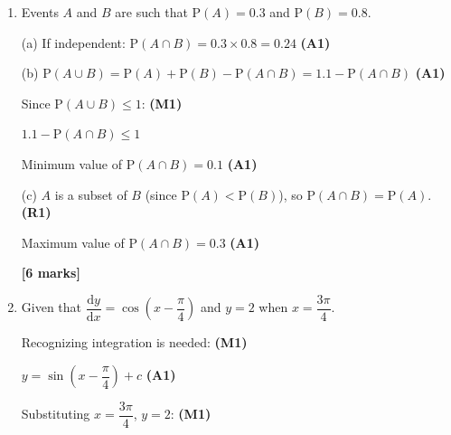 \documentclass[12pt, twoside]{article}
\begin{document}
\begin{enumerate}[itemsep=0.4cm]
Let $\theta = \dfrac{x}{2} + \dfrac{\pi}{3}$.

Reference angle for $\cos\theta = \dfrac{1}{\sqrt{2}}$: $\dfrac{\pi}{4}$ \hfill \textbf{(A1)}

$\theta = \dfrac{\pi}{4}$ gives $\dfrac{x}{2} = \dfrac{\pi}{4} - \dfrac{\pi}{3} = -\dfrac{\pi}{12}$, so $x = -\dfrac{\pi}{6}$ (negative, rejected) \hfill \textbf{(M1)(R1)}

$\theta = 2\pi - \dfrac{\pi}{4} = \dfrac{7\pi}{4}$ \hfill \textbf{(A1)}

$\dfrac{x}{2} = \dfrac{7\pi}{4} - \dfrac{\pi}{3} = \dfrac{21\pi - 4\pi}{12} = \dfrac{17\pi}{12}$

$x = \dfrac{17\pi}{6}$ \hfill \textbf{(A1)}

\textbf{[5 marks]}

\bigskip

\item Events $A$ and $B$ are such that $\mathrm{P}(A) = 0.3$ and $\mathrm{P}(B) = 0.8$.

(a) If independent: $\mathrm{P}(A \cap B) = 0.3 \times 0.8 = 0.24$ \hfill \textbf{(A1)}

\medskip
(b) $\mathrm{P}(A \cup B) = \mathrm{P}(A) + \mathrm{P}(B) - \mathrm{P}(A \cap B) = 1.1 - \mathrm{P}(A \cap B)$ \hfill \textbf{(A1)}

Since $\mathrm{P}(A \cup B) \leq 1$: \hfill \textbf{(M1)}

$1.1 - \mathrm{P}(A \cap B) \leq 1$

Minimum value of $\mathrm{P}(A \cap B) = 0.1$ \hfill \textbf{(A1)}

\medskip
(c) $A$ is a subset of $B$ (since $\mathrm{P}(A) < \mathrm{P}(B)$), so $\mathrm{P}(A \cap B) = \mathrm{P}(A)$. \hfill \textbf{(R1)}

Maximum value of $\mathrm{P}(A \cap B) = 0.3$ \hfill \textbf{(A1)}

\textbf{[6 marks]}

\bigskip

\item Given that $\dfrac{\mathrm{d}y}{\mathrm{d}x} = \cos\!\left(x - \dfrac{\pi}{4}\right)$ and $y = 2$ when $x = \dfrac{3\pi}{4}$.

Recognizing integration is needed: \hfill \textbf{(M1)}

$y = \sin\!\left(x - \dfrac{\pi}{4}\right) + c$ \hfill \textbf{(A1)}

Substituting $x = \dfrac{3\pi}{4}$, $y = 2$: \hfill \textbf{(M1)}


\end{enumerate}
\end{document}
